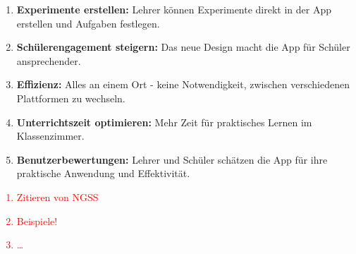 \begin{enumerate}
  \item \textbf{Experimente erstellen:} Lehrer können Experimente direkt in der App erstellen und Aufgaben festlegen.
  \item \textbf{Schülerengagement steigern:} Das neue Design macht die App für Schüler ansprechender.    
  \item \textbf{Effizienz:} Alles an einem Ort - keine Notwendigkeit, zwischen verschiedenen Plattformen zu wechseln.
  \item \textbf{Unterrichtszeit optimieren:} Mehr Zeit für praktisches Lernen im Klassenzimmer.
  \item \textbf{Benutzerbewertungen:} Lehrer und Schüler schätzen die App für ihre praktische Anwendung und Effektivität.
\end{enumerate}

\textcolor{red}{
\begin{enumerate}
    \item Zitieren von NGSS
    \item Beispiele!
    \item \ldots
\end{enumerate}
}



